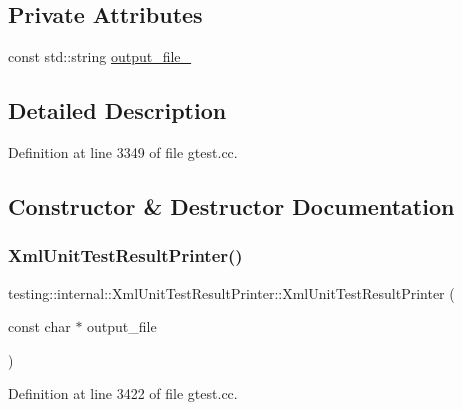 \subsection*{Private Attributes}
\begin{DoxyCompactItemize}
\item 
const std\+::string \hyperlink{classtesting_1_1internal_1_1XmlUnitTestResultPrinter_aa81cc4540d16279f5eb5f7ec9f366ea7}{output\+\_\+file\+\_\+}
\end{DoxyCompactItemize}


\subsection{Detailed Description}


Definition at line 3349 of file gtest.\+cc.



\subsection{Constructor \& Destructor Documentation}
\mbox{\label{classtesting_1_1internal_1_1XmlUnitTestResultPrinter_afdaf88e6764c18ce0dcc3733d7a06e31}} 
\subsubsection{\texorpdfstring{Xml\+Unit\+Test\+Result\+Printer()}{XmlUnitTestResultPrinter()}}
{\footnotesize\ttfamily testing\+::internal\+::\+Xml\+Unit\+Test\+Result\+Printer\+::\+Xml\+Unit\+Test\+Result\+Printer (\begin{DoxyParamCaption}\item[{const char $\ast$}]{output\+\_\+file }\end{DoxyParamCaption})\hspace{0.3cm}{\ttfamily [explicit]}}



Definition at line 3422 of file gtest.\+cc.



